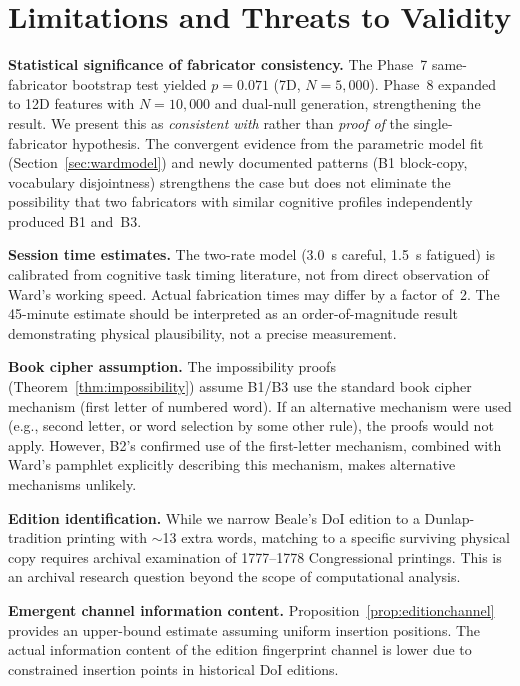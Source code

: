 \documentclass[11pt,a4paper]{article}
\begin{document}
\section{Limitations and Threats to Validity}
\label{sec:limitations}

\textbf{Statistical significance of fabricator consistency.}
The Phase~7 same-fabricator bootstrap test yielded $p{=}0.071$ (7D, $N{=}5{,}000$).
Phase~8 expanded to 12D features with $N{=}10{,}000$ and dual-null generation,
strengthening the result. We present this as
\emph{consistent with} rather than \emph{proof of} the single-fabricator
hypothesis. The convergent evidence from the parametric model fit
(Section~\ref{sec:wardmodel}) and newly documented patterns (B1 block-copy,
vocabulary disjointness) strengthens the case but does not eliminate
the possibility that two fabricators with similar cognitive profiles
independently produced B1 and~B3.

\textbf{Session time estimates.}
The two-rate model (3.0~s careful, 1.5~s fatigued) is calibrated from
cognitive task timing literature, not from direct observation of Ward's
working speed. Actual fabrication times may differ by a factor of~2.
The 45-minute estimate should be interpreted as an order-of-magnitude
result demonstrating physical plausibility, not a precise measurement.

\textbf{Book cipher assumption.}
The impossibility proofs (Theorem~\ref{thm:impossibility}) assume B1/B3
use the standard book cipher mechanism (first letter of numbered word).
If an alternative mechanism were used (e.g., second letter, or word
selection by some other rule), the proofs would not apply. However, B2's
confirmed use of the first-letter mechanism, combined with Ward's
pamphlet explicitly describing this mechanism, makes alternative
mechanisms unlikely.

\textbf{Edition identification.}
While we narrow Beale's DoI edition to a Dunlap-tradition printing with
$\sim$13 extra words, matching to a specific surviving physical copy
requires archival examination of 1777--1778 Congressional printings.
This is an archival research question beyond the scope of computational
analysis.

\textbf{Emergent channel information content.}
Proposition~\ref{prop:editionchannel} provides an upper-bound estimate
assuming uniform insertion positions. The actual information content of
the edition fingerprint channel is lower due to constrained insertion
points in historical DoI editions.
\end{document}
